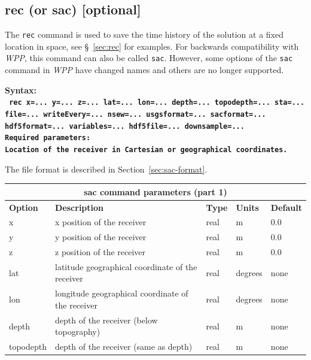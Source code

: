 \documentclass[11pt]{report}
\begin{document}
\subsection{rec (or sac) [optional]}
The \verb+rec+ command is used to save the time history of the solution at a fixed location in
space, see \S~\ref{sec:rec} for examples. For backwards compatibility with \emph{WPP}, this command
can also be called \verb+sac+. However, some options of the \verb+sac+ command in \emph{WPP} have
changed names and others are no longer supported.
\begin{flushleft}
\bf
Syntax:\\
\tt
rec x=... y=... z=... lat=... lon=... depth=... topodepth=... sta=... file=... writeEvery=... nsew=... usgsformat=... sacformat=... hdf5format=... variables=... hdf5file=... downsample=...
\\
\bf Required parameters:\\
\rm Location of the receiver in Cartesian or geographical coordinates.
\end{flushleft}
%
The file format is described in Section~\ref{sec:sac-format}.
%
\begin{center}
\begin{tabular}{|l|p{8cm}|l|l|l|} \hline
\multicolumn{5}{|c|}{\bf sac command parameters (part 1)}\\ \hline
\bf{Option} & \bf{Description} & \bf{Type} & \bf{Units} & \bf{Default} \\ \hline \hline
x & x position of the receiver & real & m & 0.0 \\ \hline
y & y position of the receiver & real & m & 0.0 \\ \hline
z & z position of the receiver & real & m & 0.0 \\ \hline
\hline
lat & latitude geographical coordinate of the receiver & real & degrees & none \\ \hline
lon & longitude geographical coordinate of the receiver & real & degrees & none \\ \hline
depth & depth of the receiver (below topography) & real & m & none \\ \hline
topodepth & depth of the receiver (same as depth) & real & m & none \\ \hline
\end{tabular}
\end{center}
\end{document}
